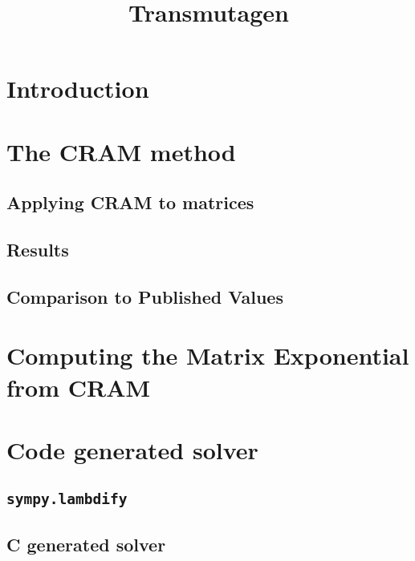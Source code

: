 \documentclass{article}
\title{Transmutagen}
\begin{document}
\flushbottom
\maketitle
\thispagestyle{empty}

\begin{abstract}

\end{abstract}


\section{Introduction}
\label{sec:intro}


\section{The CRAM method}
\label{sec:cram-method}


\subsection{Applying CRAM to matrices}
\label{sec:cram-matrices}


\subsection{Results}
\label{sec:cram-results}


\subsection{Comparison to Published Values}

\section{Computing the Matrix Exponential from CRAM}
\label{sec:matrix-cram}


\section{Code generated solver}
\subsection{\texttt{sympy.lambdify}}
\label{sec:lambdify-solve}


\subsection{C generated solver}
\label{sec:c-solve}

\end{document}
